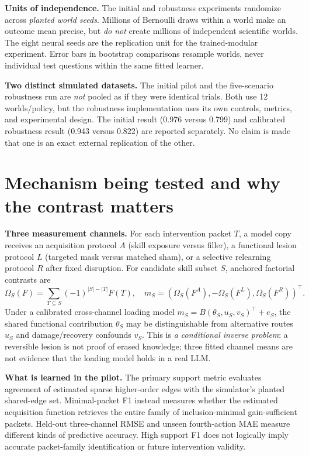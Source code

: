 \documentclass[10.5pt,a4paper]{article}
\begin{document}
\textbf{Units of independence.} The initial and robustness experiments randomize across \emph{planted world seeds}. Millions of Bernoulli draws within a world make an outcome mean precise, but \emph{do not} create millions of independent scientific worlds. The eight neural seeds are the replication unit for the trained-modular experiment. Error bars in bootstrap comparisons resample worlds, never individual test questions within the same fitted learner.

\textbf{Two distinct simulated datasets.} The initial pilot and the five-scenario robustness run are \emph{not} pooled as if they were identical trials. Both use 12 worlds/policy, but the robustness implementation uses its own controls, metrics, and experimental design. The initial result (0.976 versus 0.799) and calibrated robustness result (0.943 versus 0.822) are reported separately. No claim is made that one is an exact external replication of the other.

\section{Mechanism being tested and why the contrast matters}
\textbf{Three measurement channels.} For each intervention packet $T$, a model copy receives an acquisition protocol $A$ (skill exposure versus filler), a functional lesion protocol $L$ (targeted mask versus matched sham), or a selective relearning protocol $R$ after fixed disruption. For candidate skill subset $S$, anchored factorial contrasts are
\[
\Omega_S(F)=\sum_{T\subseteq S}(-1)^{|S|-|T|}F(T),\quad
m_S=(\Omega_S(F^A),-\Omega_S(F^L),\Omega_S(F^R))^\top.
\]
Under a calibrated cross-channel loading model $m_S=B(\theta_S,u_S,v_S)^\top+e_S$, the shared functional contribution $\theta_S$ may be distinguishable from alternative routes $u_S$ and damage/recovery confounds $v_S$. This is \emph{a conditional inverse problem}: a reversible lesion is not proof of erased knowledge; three fitted channel means are not evidence that the loading model holds in a real LLM.

\textbf{What is learned in the pilot.} The primary support metric evaluates agreement of estimated sparse higher-order edges with the simulator's planted shared-edge set. Minimal-packet F1 instead measures whether the estimated acquisition function retrieves the entire family of inclusion-minimal gain-sufficient packets. Held-out three-channel RMSE and unseen fourth-action MAE measure different kinds of predictive accuracy. High support F1 does not logically imply accurate packet-family identification or future intervention validity.
\end{document}
